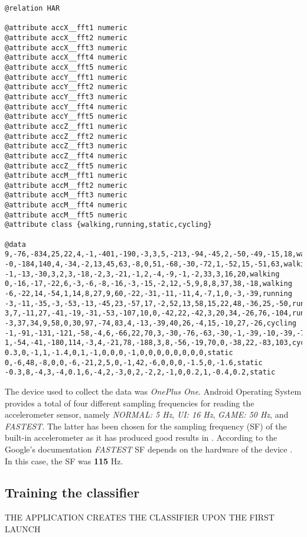 \begin{lstlisting}[caption=WEKA ARFF file extract,
label=weka-arff-code,captionpos=b, frame=single,basicstyle=\small,float,floatplacement=H,breaklines=true]
@relation HAR
    
@attribute accX__fft1 numeric
@attribute accX__fft2 numeric
@attribute accX__fft3 numeric
@attribute accX__fft4 numeric
@attribute accX__fft5 numeric
@attribute accY__fft1 numeric
@attribute accY__fft2 numeric
@attribute accY__fft3 numeric
@attribute accY__fft4 numeric
@attribute accY__fft5 numeric
@attribute accZ__fft1 numeric
@attribute accZ__fft2 numeric
@attribute accZ__fft3 numeric
@attribute accZ__fft4 numeric
@attribute accZ__fft5 numeric
@attribute accM__fft1 numeric
@attribute accM__fft2 numeric
@attribute accM__fft3 numeric
@attribute accM__fft4 numeric
@attribute accM__fft5 numeric
@attribute class {walking,running,static,cycling}
    
@data
9,-76,-834,25,22,4,-1,-401,-190,-3,3,5,-213,-94,-45,2,-50,-49,-15,18,walking
-0,-184,140,4,-34,-2,13,45,63,-8,0,51,-68,-30,-72,1,-52,15,-51,63,walking
-1,-13,-30,3,2,3,-18,-2,3,-21,-1,2,-4,-9,-1,-2,33,3,16,20,walking
0,-16,-17,-22,6,-3,-6,-8,-16,-3,-15,-2,12,-5,9,8,8,37,38,-18,walking
-6,-22,14,-54,1,14,8,27,9,60,-22,-31,-11,-11,4,-7,1,0,-3,-39,running
-3,-11,-35,-3,-53,-13,-45,23,-57,17,-2,52,13,58,15,22,48,-36,25,-50,running
3,7,-11,27,-41,-19,-31,-53,-107,10,0,-42,22,-42,3,20,34,-26,76,-104,running
-3,37,34,9,58,0,30,97,-74,83,4,-13,-39,40,26,-4,15,-10,27,-26,cycling
-1,-91,-131,-121,-58,-4,6,-66,22,70,3,-30,-76,-63,-30,-1,-39,-10,-39,-76,cycling
1,-54,-41,-180,114,-3,4,-21,78,-188,3,8,-56,-19,70,0,-38,22,-83,103,cycling
0.3,0,-1,1,-1.4,0,1,-1,0,0,0,-1,0,0,0,0,0,0,0,0,static
0,-6,48,-8,0,0,-6,-21,2,5,0,-1,42,-6,0,0,0,-1.5,0,-1.6,static
-0.3,8,-4,3,-4,0.1,6,-4,2,-3,0,2,-2,2,-1,0,0.2,1,-0.4,0.2,static
\end{lstlisting}
    
    The device used to collect the data was \textit{OnePlus One}. Android Operating System provides a total of four different sampling frequencies for reading the accelerometer sensor, namely \textit{NORMAL: 5 Hz}, \textit{UI: 16 Hz}, \textit{GAME: 50 Hz}, and \textit{FASTEST}. The latter has been chosen for the sampling frequency (SF) of the built-in accelerometer as it has produced good results in \citet[3-5]{lee2016}. According to the Google's documentation \textit{FASTEST} SF depends on the hardware of the device \citep{googlesensormanager2017}. In this case, the SF was \textbf{115} Hz. 
    
    \subsection{Training the classifier}
    THE APPLICATION CREATES THE CLASSIFIER UPON THE FIRST LAUNCH
    
    
    